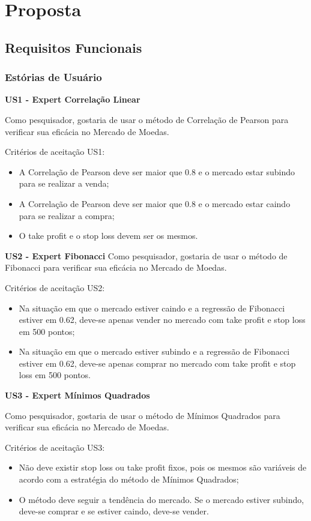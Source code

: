 \chapter{Proposta}

\section{Requisitos Funcionais}
\subsection{Estórias de Usuário}
\textbf{US1 - Expert Correlação Linear}

Como pesquisador, gostaria de usar o método de Correlação de Pearson para verificar sua eficácia no Mercado de Moedas.

Critérios de aceitação US1:
\begin{itemize}
\item A Correlação de Pearson deve ser maior que 0.8 e o mercado estar subindo para se realizar a venda;
\item A Correlação de Pearson deve ser maior que 0.8 e o mercado estar caindo para se realizar a compra;
\item O take profit e o stop loss devem ser os mesmos.
\end{itemize}

\textbf{US2 - Expert Fibonacci}
Como pesquisador, gostaria de usar o método de Fibonacci para verificar sua eficácia no Mercado de Moedas.

Critérios de aceitação US2:
\begin{itemize}
\item Na situação em que o mercado estiver caindo e a regressão de Fibonacci estiver em 0.62, deve-se apenas vender no mercado com take profit e stop loss em 500 pontos;
\item Na situação em que o mercado estiver subindo e a regressão de Fibonacci estiver em 0.62, deve-se apenas comprar no mercado com take profit e stop loss em 500 pontos.
\end{itemize}

\textbf{US3 - Expert Mínimos Quadrados}

Como pesquisador, gostaria de usar o método de Mínimos Quadrados para verificar sua eficácia no Mercado de Moedas.

Critérios de aceitação US3:
\begin{itemize}
\item Não deve existir stop loss ou take profit fixos, pois os mesmos são variáveis de acordo com a estratégia do método de Mínimos Quadrados;
\item O método deve seguir a tendência do mercado. Se o mercado estiver subindo, deve-se comprar e se estiver caindo, deve-se vender.
\end{itemize}

